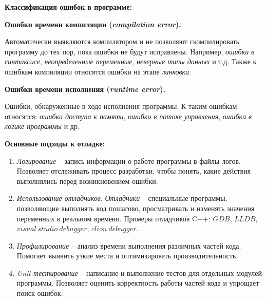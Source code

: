 {\centering \textbf{Классификация ошибок в программе:}}\\
\begin{minipage}[t]{0.45\textwidth}
	\begin{center} \textbf{Ошибки времени компиляции (\textit{compilation error}).} \end{center}
	Автоматически выявляются компилятором и не позволяют скомпилировать программу до тех пор, пока ошибки не будут исправлены. Например, \textit{ошибки в синтаксисе}, \textit{неопределенные переменные}, \textit{неверные типы данных} и т.д. Также к ошибкам компиляции относятся ошибки на этапе \textit{линковки}.
\end{minipage}
\hspace{1cm}
\begin{minipage}[t]{0.45\textwidth}
	\begin{center} \textbf{Ошибки времени исполнения (\textit{runtime error}).} \end{center}
	Ошибки, обнаруженные в ходе исполнения программы. К таким ошибкам относятся: \textit{ошибки доступа к памяти}, \textit{ошибки в потоке управления}, \textit{ошибки в логике программы} и др.
\end{minipage}
\vspace{5pt}

\textbf{Основные подходы к отладке:}\par
\begin{enumerate}[font=\footnotesize, noitemsep, topsep=0pt, , partopsep=0pt]
	\item \textit{Логирование} -- запись‍ информации о работе  программы в файлы логов. Позволяет отслеживать процесс разработки, чтобы понять, какие ‌действия выполнялись перед возникновением ошибки.
	\item \textit{Использование отладчиков}. \textit{Отладчики} -- специальные программы, позволяющие выполнять код пошагово, просматривать и изменять значения переменных ​в реальном времени. Примеры отладчиков C++: $GDB$, $LLDB$, $visual \ studio \ debugger$, $clion \ debugger$.
	\item \textit{Профилирование} -- анализ времени выполнения различных частей кода. Помогает выявить узкие места и оптимизировать производительность.
	\item \textit{Unit-тестирование} -- написание‌ и выполнение тестов для отдельных модулей программы. Позволяет оценить корректность работы частей кода и упрощает поиск ошибок.
\end{enumerate}
\vspace{10pt}

